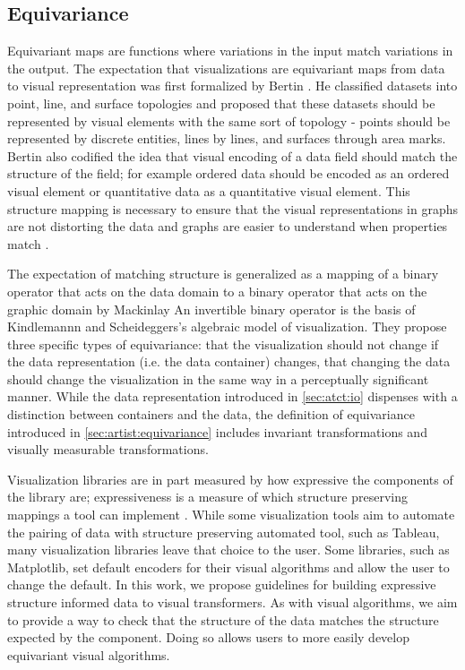 \documentclass[10pt,journal,compsoc]{IEEEtran}
\theoremstyle{definition}
\theoremstyle{remark}
\begin{document}
\subsection{Equivariance}
Equivariant maps are functions where variations in the input match variations in the output. The expectation that visualizations are equivariant maps from data to visual representation was first formalized by Bertin \cite{bertinSemiologyGraphicsDiagrams2011a}. He classified datasets into point, line, and surface topologies and proposed that these datasets should be represented by visual elements with the same sort of topology - points should be represented by discrete entities, lines by lines, and surfaces through area marks. Bertin also codified the idea that visual encoding of a data field should match the structure of the field; for example ordered data should be encoded as an ordered visual element or quantitative data as a quantitative visual element. This structure mapping is necessary to ensure that the visual representations in graphs are not distorting the data\cite{tufteVisualDisplayQuantitative2001} and graphs are easier to understand when properties match \cite{norman_things_smart}.

The expectation of matching structure is generalized as a mapping of a binary operator that acts on the data domain to a binary operator that acts on the graphic domain by Mackinlay\cite{mackinlayAutomaticDesignGraphical1987} An invertible binary operator is the basis of Kindlemannn and Scheideggers's algebraic model of visualization\cite{kindlmannAlgebraicProcessVisualization2014}. They propose three specific types of equivariance: that the visualization should not change if the data representation (i.e. the data container) changes, that changing the data should change the visualization in the same way in a perceptually significant manner. While the data representation introduced in \autoref{sec:atct:io} dispenses with a distinction between containers and the data, the definition of equivariance introduced in  \autoref{sec:artist:equivariance} includes invariant transformations and visually measurable transformations. 

Visualization libraries are in part measured by how expressive the components of the library are; expressiveness is a measure of which structure preserving mappings a tool can implement \cite{mackinlayAutomaticDesignGraphical1987}. While some visualization tools aim to automate the pairing of data with structure preserving automated tool, such as Tableau\cite{StoltePolaris2002,hanrahanVizQL2006,MackinlayShowme2007}, many visualization libraries leave that choice to the user. Some libraries, such as Matplotlib, set default encoders for their visual algorithms and allow the user to change the default. In this work, we propose guidelines for building expressive structure informed data to visual transformers. As with visual algorithms, we aim to provide a way to check that the structure of the data matches the structure expected by the component. Doing so allows users to more easily develop equivariant visual algorithms.
\end{document}
